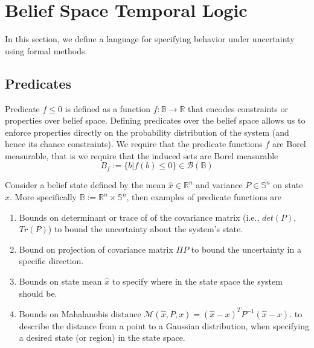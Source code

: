 \documentclass[conference]{IEEEtran}
\renewcommand{\S}{\mathbb S}
\newcommand{\borel}[1]{\mathcal{B}\left(#1\right)}
\begin{document}
\section{Belief Space Temporal Logic}

	In this section, we define a language for specifying behavior under uncertainty using formal methods. 
	
	
	
	
    
    
	\subsection{Predicates}\label{sec:DTL}  
    
  
    
     Predicate $f\leq 0$ is defined as a function $f:\mathbb{B}\rightarrow \mathbb{R}$ that encodes constraints or properties over belief space. Defining predicates over the belief space allows us to enforce properties directly on the probability distribution of the system (and hence its chance constraints). 
     We require that the predicate functions $f$ are Borel measurable, that is we require that the induced sets  are Borel measurable
     \[B_f:=\{b|f(b)\leq 0\}\in \borel{\mathbb B}\] 
     

     
     Consider a belief state defined by the mean $\hat x\in \mathbb R^n $ and variance $P\in \S^n$ on state $x$. More specifically $\mathbb B:=\mathbb R^n\times \S^n$,  then examples of predicate functions are  \begin{enumerate}
 	\item Bounds on determinant or trace of of the covariance matrix (i.e., $det(P)$, $Tr(P)$) to  bound the uncertainty about the system's state.
 	\item Bound on projection of covariance matrix $\Pi P$ to bound the uncertainty in a specific direction.
   \item   Bounds on state mean $\hat{x}$ to specify
    where in the state space the system should be. 
    \item Bounds on Mahalanobis distance $\mathcal{M}(\hat{x},P,x) = (\hat{x}-x)^TP^{-1}(\hat{x}-x)$.
    to describe the distance from a point to a Gaussian distribution, when specifying a desired state (or region) in the state space. 
    \end{enumerate}
 
\end{document}

